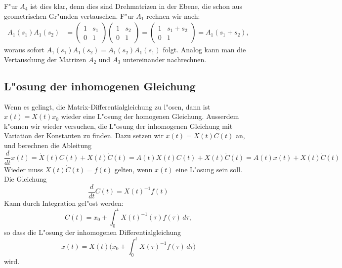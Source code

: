F"ur $A_4$ ist dies klar, denn dies sind Drehmatrizen in der Ebene,
die schon aus geometrischen Gr"unden vertauschen.
F"ur $A_1$ rechnen wir nach:
\begin{align*}
A_1(s_1)A_1(s_2)
&=
\begin{pmatrix}1&s_1\\0&1\end{pmatrix}
\begin{pmatrix}1&s_2\\0&1\end{pmatrix}
=
\begin{pmatrix}1&s_1+s_2\\0&1\end{pmatrix}
=
A_1(s_1+s_2),
\end{align*}
woraus sofort
$
A_1(s_1)A_1(s_2)=
A_1(s_2)A_1(s_1)
$
folgt.
Analog kann man die Vertauschung der Matrizen $A_2$ und $A_3$ untereinander
nachrechnen.

\subsection{L"osung der inhomogenen Gleichung}
Wenn es gelingt, die Matrix-Differentialgleichung zu l"osen, dann
ist $x(t)=X(t)x_0$ wieder eine L"osung der homogenen Gleichung.
Ausserdem k"onnen wir wieder versuchen, die L"osung der inhomogenen
Gleichung mit Variation der Konstanten zu finden.
Dazu setzen wir $x(t)=X(t)C(t)$ an, und berechnen die Ableitung
\[
\frac{d}{dt}x(t)
=
\dot{X}(t)C(t)+X(t)\dot{C}(t)
=
A(t)X(t)C(t)+X(t)\dot{C}(t)
=
A(t)x(t)+X(t)\dot{C}(t)
\]
Wieder muss $X(t)\dot{C}(t)=f(t)$ gelten, wenn $x(t)$ eine L"osung sein
soll.
Die Gleichung
\[
\frac{d}{dt}C(t)
=
X(t)^{-1}f(t)
\]
Kann durch Integration gel"ost werden:
\[
C(t)
=x_0+\int_0^t X(t)^{-1}(\tau)f(\tau)\,d\tau,
\]
so dass die L"osung der inhomogenen Differentialgleichung
\[
x(t)=X(t)\biggl(x_0+\int_0^t X(\tau)^{-1} f(\tau)\,d\tau\biggr)
\]
wird.
